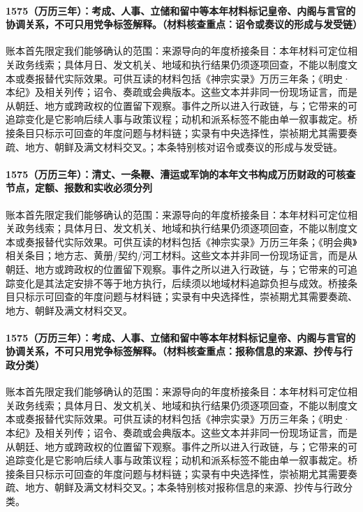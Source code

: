 \paragraph{1575（万历三年）：考成、人事、立储和留中等本年材料标记皇帝、内阁与言官的协调关系，不可只用党争标签解释。（材料核查重点：诏令或奏议的形成与发受链）} 账本首先限定我们能够确认的范围：来源导向的年度桥接条目：本年材料可定位相关政务线索；具体月日、发文机关、地域和执行结果仍须逐项回查，不能以制度文本或奏报替代实际效果。可供互读的材料包括《神宗实录》万历三年条；《明史·本纪》及相关列传；诏令、奏疏或会典版本。这些文本并非同一份现场证言，而是从朝廷、地方或跨政权的位置留下观察。事件之所以进入行政链，与；它带来的可追踪变化是它影响后续人事与政策议程；动机和派系标签不能由单一叙事裁定。桥接条目只标示可回查的年度问题与材料链；实录有中央选择性，崇祯期尤其需要奏疏、地方、朝鲜及满文材料交叉。；本条特别核对诏令或奏议的形成与发受链。

\paragraph{1575（万历三年）：清丈、一条鞭、漕运或军饷的本年文书构成万历财政的可核查节点，定额、报数和实收必须分列} 账本首先限定我们能够确认的范围：来源导向的年度桥接条目：本年材料可定位相关政务线索；具体月日、发文机关、地域和执行结果仍须逐项回查，不能以制度文本或奏报替代实际效果。可供互读的材料包括《神宗实录》万历三年条；《明会典》相关条目；地方志、黄册/契约/河工材料。这些文本并非同一份现场证言，而是从朝廷、地方或跨政权的位置留下观察。事件之所以进入行政链，与；它带来的可追踪变化是其法定安排不等于地方执行，后续须以地域材料追踪负担与成效。桥接条目只标示可回查的年度问题与材料链；实录有中央选择性，崇祯期尤其需要奏疏、地方、朝鲜及满文材料交叉。

\paragraph{1575（万历三年）：考成、人事、立储和留中等本年材料标记皇帝、内阁与言官的协调关系，不可只用党争标签解释。（材料核查重点：报称信息的来源、抄传与行政分类）} 账本首先限定我们能够确认的范围：来源导向的年度桥接条目：本年材料可定位相关政务线索；具体月日、发文机关、地域和执行结果仍须逐项回查，不能以制度文本或奏报替代实际效果。可供互读的材料包括《神宗实录》万历三年条；《明史·本纪》及相关列传；诏令、奏疏或会典版本。这些文本并非同一份现场证言，而是从朝廷、地方或跨政权的位置留下观察。事件之所以进入行政链，与；它带来的可追踪变化是它影响后续人事与政策议程；动机和派系标签不能由单一叙事裁定。桥接条目只标示可回查的年度问题与材料链；实录有中央选择性，崇祯期尤其需要奏疏、地方、朝鲜及满文材料交叉。；本条特别核对报称信息的来源、抄传与行政分类。

